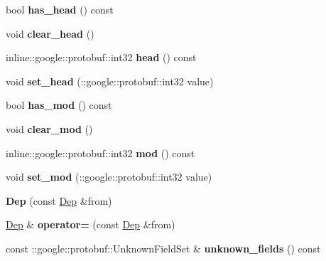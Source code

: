 \begin{DoxyCompactItemize}
\item 
\hypertarget{classDep_a7c31851d796bf8cb968b420fd07548cb}{
bool {\bfseries has\_\-head} () const }
\label{classDep_a7c31851d796bf8cb968b420fd07548cb}

\item 
\hypertarget{classDep_a32575258e5019204e6f4f53822181528}{
void {\bfseries clear\_\-head} ()}
\label{classDep_a32575258e5019204e6f4f53822181528}

\item 
\hypertarget{classDep_aebc1840c3493408ef316d45dec47e1a6}{
inline::google::protobuf::int32 {\bfseries head} () const }
\label{classDep_aebc1840c3493408ef316d45dec47e1a6}

\item 
\hypertarget{classDep_a43e73a016a5444b2e9f310eb0e2b671b}{
void {\bfseries set\_\-head} (::google::protobuf::int32 value)}
\label{classDep_a43e73a016a5444b2e9f310eb0e2b671b}

\item 
\hypertarget{classDep_a81b4aebd91b63196e503f80b3f1cb5d4}{
bool {\bfseries has\_\-mod} () const }
\label{classDep_a81b4aebd91b63196e503f80b3f1cb5d4}

\item 
\hypertarget{classDep_a286ffa524525424af7af0c509282b22c}{
void {\bfseries clear\_\-mod} ()}
\label{classDep_a286ffa524525424af7af0c509282b22c}

\item 
\hypertarget{classDep_a8b9785a6c223f1dcce0c1a0403bbb1dc}{
inline::google::protobuf::int32 {\bfseries mod} () const }
\label{classDep_a8b9785a6c223f1dcce0c1a0403bbb1dc}

\item 
\hypertarget{classDep_a3aa1f026840c0ec1631e4383399309f8}{
void {\bfseries set\_\-mod} (::google::protobuf::int32 value)}
\label{classDep_a3aa1f026840c0ec1631e4383399309f8}

\item 
\hypertarget{classDep_a80362e936565b55abb269a18fde4dc59}{
{\bfseries Dep} (const \hyperlink{classDep}{Dep} \&from)}
\label{classDep_a80362e936565b55abb269a18fde4dc59}

\item 
\hypertarget{classDep_a87fdb64571ed9949e3fa5acdb9b367f9}{
\hyperlink{classDep}{Dep} \& {\bfseries operator=} (const \hyperlink{classDep}{Dep} \&from)}
\label{classDep_a87fdb64571ed9949e3fa5acdb9b367f9}

\item 
\hypertarget{classDep_a03cf321c0a637f65d4775ee8b63e2438}{
const ::google::protobuf::UnknownFieldSet \& {\bfseries unknown\_\-fields} () const }
\label{classDep_a03cf321c0a637f65d4775ee8b63e2438}


\end{DoxyCompactItemize}

